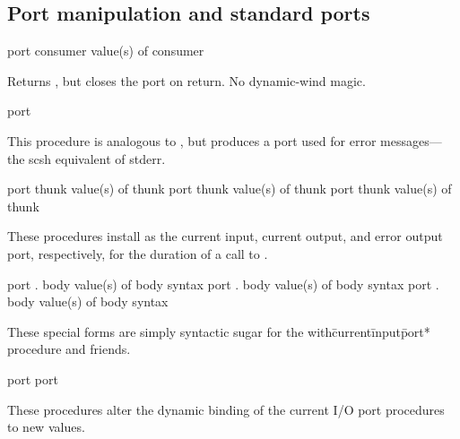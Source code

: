 \subsection{Port manipulation and standard ports}
 {port consumer} {value(s) of consumer}
\begin{desc}
    Returns , but closes the port on return.
    No dynamic-wind magic. 
\end{desc}

 {port}
\begin{desc}
This procedure is analogous to , but produces
a port used for error messages---the scsh equivalent of stderr.
\end{desc}

  {port thunk} {value(s) of thunk}
 {port thunk} {value(s) of thunk}
   {port thunk} {value(s) of thunk}
\begin{desc}
These procedures install  as the current input, current output,
and error output port, respectively, for the duration of a call to
.
\end{desc}

  {port . body} {value(s) of body} {syntax}
 {port . body} {value(s) of body} {syntax}
   {port . body} {value(s) of body} {syntax}
\begin{desc}
These special forms are simply syntactic sugar for the
{\ttt with\=current\=input\=port*} procedure and friends.
\end{desc}

 {port}{\undefined}
  {port}{\undefined}
\begin{desc}
These procedures alter the dynamic binding of the current I/O port procedures
to new values.
\end{desc}

